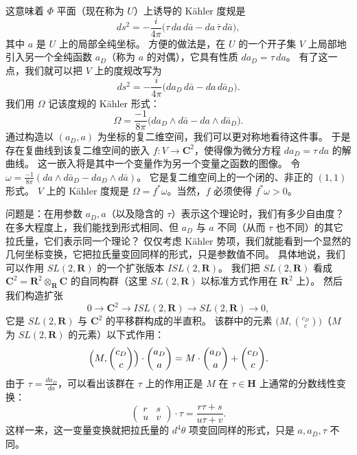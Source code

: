 这意味着 $\Phi$ 平面（现在称为 $U$）上诱导的 Kähler 度规是
\[
ds^2=-\frac{i}{4\pi}\bigl(\tau\,da\,d\bar a-da\,\bar\tau\,d\bar a\bigr),
\]
其中 $a$ 是 $U$ 上的局部全纯坐标。
方便的做法是，在 $U$ 的一个开子集 $V$ 上局部地引入另一个全纯函数 $a_D$（称为 $a$ 的对偶），它具有性质 $da_D=\tau\,da$。
有了这一点，我们就可以把 $V$ 上的度规改写为
\[
ds^2=-\frac{i}{4\pi}\bigl(da_D\,d\bar a-da\,d\bar a_D\bigr).
\]
我们用 $\Omega$ 记该度规的 Kähler 形式：
\[
\Omega=\frac{-1}{8\pi}\bigl(da_D\wedge d\bar a-da\wedge d\bar a_D\bigr).
\]
通过构造以 $(a_D,a)$ 为坐标的复二维空间，我们可以更对称地看待这件事。
于是存在复曲线到该复二维空间的嵌入 $f:V\to\mathbf{C}^2$，使得像为微分方程 $da_D=\tau\,da$ 的解曲线。
这一嵌入将是其中一个变量作为另一个变量之函数的图像。
令 $\omega=\frac{-1}{8\pi}(da\wedge d\bar a_D-da_D\wedge d\bar a)$。
它是复二维空间上的一个闭的、非正的 $(1,1)$ 形式。
$V$ 上的 Kähler 度规是 $\Omega=f^*\omega$。当然，$f$ 必须使得 $f^*\omega>0$。


问题是：在用参数 $a_D,a$（以及隐含的 $\tau$）表示这个理论时，我们有多少自由度？
在多大程度上，我们能找到形式相同、但 $a_D$ 与 $a$ 不同（从而 $\tau$ 也不同）的其它拉氏量，它们表示同一个理论？
仅仅考虑 Kähler 势项，我们就能看到一个显然的几何坐标变换，它把拉氏量变回同样的形式，只是参数值不同。
具体地说，我们可以作用 $SL(2,\mathbf{R})$ 的一个扩张版本 $ISL(2,\mathbf{R})$。
我们把 $SL(2,\mathbf{R})$ 看成 $\mathbf{C}^2=\mathbf{R}^2\otimes_{\mathbf{R}}\mathbf{C}$ 的自同构群（这里 $SL(2,\mathbf{R})$ 以标准方式作用在 $\mathbf{R}^2$ 上）。
然后我们构造扩张
\[
0\to\mathbf{C}^2\to ISL(2,\mathbf{R})\to SL(2,\mathbf{R})\to0,
\]
它是 $SL(2,\mathbf{R})$ 与 $\mathbf{C}^2$ 的平移群构成的半直积。
该群中的元素 $\bigl(M,\binom{c_D}{c}\bigr)$（$M$ 为 $SL(2,\mathbf{R})$ 的元素）以下式作用：
\[
\Bigl(M,\binom{c_D}{c}\Bigr)\cdot\binom{a_D}{a}
=M\cdot\binom{a_D}{a}+\binom{c_D}{c}.
\]
由于 $\tau=\frac{da_D}{da}$，可以看出该群在 $\tau$ 上的作用正是 $M$ 在 $\tau\in\mathbf{H}$ 上通常的分数线性变换：
\[
\begin{pmatrix}r&s\\u&v\end{pmatrix}\cdot\tau=\frac{r\tau+s}{u\tau+v}.
\]
这样一来，这一变量变换就把拉氏量的 $d^4\theta$ 项变回同样的形式，只是 $a,a_D,\tau$ 不同。

